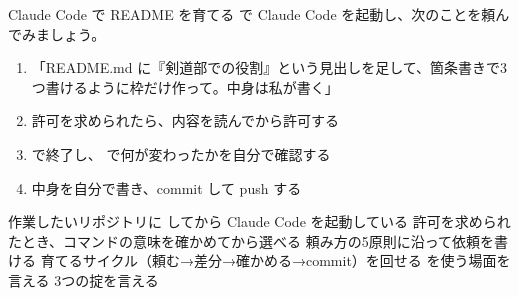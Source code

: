 \begin{step}{Claude Code で README を育てる}
 で Claude Code を起動し、次のことを頼んでみましょう。
\begin{enumerate}
  \item 「README.md に『剣道部での役割』という見出しを足して、箇条書きで3つ書けるように枠だけ作って。中身は私が書く」
  \item 許可を求められたら、内容を読んでから許可する
  \item {} で終了し、 で何が変わったかを自分で確認する
  \item 中身を自分で書き、commit して push する
\end{enumerate}
\end{step}

\begin{checklist}
\begin{itemize}
  \checkitem 作業したいリポジトリに  してから Claude Code を起動している
  \checkitem 許可を求められたとき、コマンドの意味を確かめてから選べる
  \checkitem 頼み方の5原則に沿って依頼を書ける
  \checkitem 育てるサイクル（頼む→差分→確かめる→commit）を回せる
  \checkitem {} を使う場面を言える
  \checkitem 3つの掟を言える
\end{itemize}
\end{checklist}
